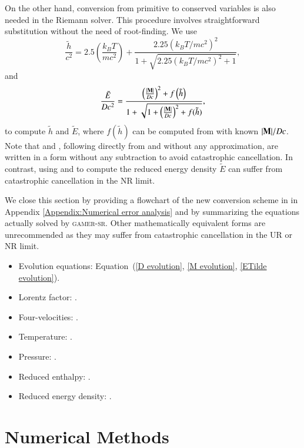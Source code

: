\documentclass[twocolumn]{aastex63}
\begin{document}
On the other hand, conversion from primitive to conserved variables is also needed in the Riemann solver. This procedure involves straightforward substitution without the need of root-finding. We use
\begin{equation}
\frac{\tilde{h}}{c^2} = 2.5\left(\frac{k_{B}T}{mc^2}\right)+\frac{2.25\left(k_{B}T/mc^2\right)^2}{1+\sqrt{2.25\left(k_{B}T/mc^2\right)^2+1}},
\label{eq:T_to_HTilde}
\end{equation}
and
\begin{equation}
\frac{\tilde{E}}{Dc^2} = \frac{\left(\frac{\abs{\mathbf{M}}}{Dc}\right)^2+f\left(\tilde{h}\right)}{1+\sqrt{1+\left(\frac{\abs{\mathbf{M}}}{Dc}\right)^2+f(\tilde{h})}},
\label{eq:E_D}
\end{equation}
to compute $\tilde{h}$ and $\tilde{E}$, where $f(\tilde{h})$ can be computed from  with known $\abs{\mathbf{M}}/Dc$. Note that  and , following directly from  and  without any approximation, are written in a form without any subtraction to avoid catastrophic cancellation. In contrast, using  and  to compute the reduced energy density $\tilde{E}$ can suffer from catastrophic cancellation in the NR limit.

We close this section by providing a flowchart of the new conversion scheme in  in Appendix \ref{Appendix:Numerical error analysis} and by summarizing the equations actually solved by \textsc{gamer-sr}. Other mathematically equivalent forms are unrecommended as they may suffer from catastrophic cancellation in the UR or NR limit.
\begin{itemize}
\item Evolution equations: Equation~(\ref{D evolution}, \ref{M evolution}, \ref{ETilde evolution}).
\item Lorentz factor:
.
\item Four-velocities: .
\item Temperature: .
\item Pressure: .
\item Reduced enthalpy: .
\item Reduced energy density: .
\end{itemize}

\section{Numerical Methods}
\label{Numerical Method}
\end{document}
